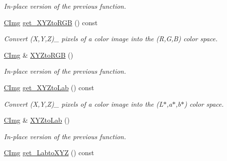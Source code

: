 \begin{DoxyCompactItemize}
\begin{DoxyCompactList}\small\item\em In-\/place version of the previous function. \end{DoxyCompactList}\item 
\hypertarget{structcimg__library_1_1_c_img_a370c0942882e30cc1ab4078503cabc02}{\hyperlink{structcimg__library_1_1_c_img}{C\-Img} \hyperlink{structcimg__library_1_1_c_img_a370c0942882e30cc1ab4078503cabc02}{get\-\_\-\-X\-Y\-Zto\-R\-G\-B} () const }\label{structcimg__library_1_1_c_img_a370c0942882e30cc1ab4078503cabc02}

\begin{DoxyCompactList}\small\item\em Convert (X,Y,Z)\-\_ pixels of a color image into the (R,G,B) color space. \end{DoxyCompactList}\item 
\hypertarget{structcimg__library_1_1_c_img_a2dab17374e2b1930b74852a58ec124e1}{\hyperlink{structcimg__library_1_1_c_img}{C\-Img} \& \hyperlink{structcimg__library_1_1_c_img_a2dab17374e2b1930b74852a58ec124e1}{X\-Y\-Zto\-R\-G\-B} ()}\label{structcimg__library_1_1_c_img_a2dab17374e2b1930b74852a58ec124e1}

\begin{DoxyCompactList}\small\item\em In-\/place version of the previous function. \end{DoxyCompactList}\item 
\hypertarget{structcimg__library_1_1_c_img_ab6bf2a2a5e40c457a22b946a95522dd6}{\hyperlink{structcimg__library_1_1_c_img}{C\-Img} \hyperlink{structcimg__library_1_1_c_img_ab6bf2a2a5e40c457a22b946a95522dd6}{get\-\_\-\-X\-Y\-Zto\-Lab} () const }\label{structcimg__library_1_1_c_img_ab6bf2a2a5e40c457a22b946a95522dd6}

\begin{DoxyCompactList}\small\item\em Convert (X,Y,Z)\-\_ pixels of a color image into the (L$\ast$,a$\ast$,b$\ast$) color space. \end{DoxyCompactList}\item 
\hypertarget{structcimg__library_1_1_c_img_ab98f0e76e7e3a0faba9317edf291c05d}{\hyperlink{structcimg__library_1_1_c_img}{C\-Img} \& \hyperlink{structcimg__library_1_1_c_img_ab98f0e76e7e3a0faba9317edf291c05d}{X\-Y\-Zto\-Lab} ()}\label{structcimg__library_1_1_c_img_ab98f0e76e7e3a0faba9317edf291c05d}

\begin{DoxyCompactList}\small\item\em In-\/place version of the previous function. \end{DoxyCompactList}\item 
\hypertarget{structcimg__library_1_1_c_img_a30914eaf157ea70a4dbc56916c1d0886}{\hyperlink{structcimg__library_1_1_c_img}{C\-Img} \hyperlink{structcimg__library_1_1_c_img_a30914eaf157ea70a4dbc56916c1d0886}{get\-\_\-\-Labto\-X\-Y\-Z} () const }\label{structcimg__library_1_1_c_img_a30914eaf157ea70a4dbc56916c1d0886}


\end{DoxyCompactItemize}
